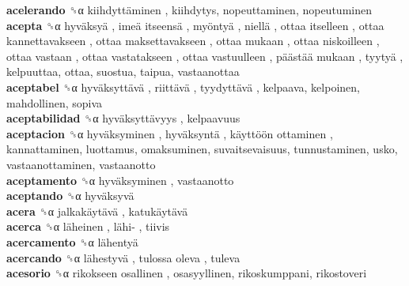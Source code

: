 \textbf{acelerando} ␝α   kiihdyttäminen , kiihdytys, nopeuttaminen, nopeutuminen  \\
\textbf{acepta} ␝α   hyväksyä ,  imeä itseensä ,  myöntyä ,  niellä ,  ottaa itselleen ,  ottaa kannettavakseen ,  ottaa maksettavakseen ,  ottaa mukaan ,  ottaa niskoilleen ,  ottaa vastaan ,  ottaa vastatakseen ,  ottaa vastuulleen ,  päästää mukaan ,  tyytyä , kelpuuttaa, ottaa, suostua, taipua, vastaanottaa  \\
\textbf{aceptabel} ␝α   hyväksyttävä ,  riittävä ,  tyydyttävä , kelpaava, kelpoinen, mahdollinen, sopiva  \\
\textbf{aceptabilidad} ␝α   hyväksyttävyys , kelpaavuus  \\
\textbf{aceptacion} ␝α   hyväksyminen ,  hyväksyntä ,  käyttöön ottaminen , kannattaminen, luottamus, omaksuminen, suvaitsevaisuus, tunnustaminen, usko, vastaanottaminen, vastaanotto  \\
\textbf{aceptamento} ␝α   hyväksyminen , vastaanotto  \\
\textbf{aceptando} ␝α   hyväksyvä   \\
\textbf{acera} ␝α   jalkakäytävä ,  katukäytävä   \\
\textbf{acerca} ␝α   läheinen ,  lähi- , tiivis  \\
\textbf{acercamento} ␝α   lähentyä   \\
\textbf{acercando} ␝α   lähestyvä ,  tulossa oleva , tuleva  \\
\textbf{acesorio} ␝α   rikokseen osallinen , osasyyllinen, rikoskumppani, rikostoveri  \\
